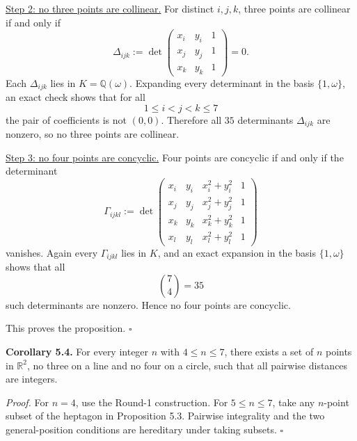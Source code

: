 \smallskip
\noindent\underline{Step 2: no three points are collinear.}
For distinct $i,j,k$, three points are collinear if and only if
\[
\Delta_{ijk}:=\det\begin{pmatrix}
x_i & y_i & 1\\
x_j & y_j & 1\\
x_k & y_k & 1
\end{pmatrix}=0.
\]
Each $\Delta_{ijk}$ lies in $K=\mathbb{Q}(\omega)$. Expanding every determinant in the basis $\{1,\omega\}$, an exact check shows that for all
\[
1\leq i<j<k\leq 7
\]
the pair of coefficients is not $(0,0)$. Therefore all $35$ determinants $\Delta_{ijk}$ are nonzero, so no three points are collinear.

\smallskip
\noindent\underline{Step 3: no four points are concyclic.}
Four points are concyclic if and only if the determinant
\[
\Gamma_{ijkl}:=\det\begin{pmatrix}
x_i & y_i & x_i^2+y_i^2 & 1\\
x_j & y_j & x_j^2+y_j^2 & 1\\
x_k & y_k & x_k^2+y_k^2 & 1\\
x_l & y_l & x_l^2+y_l^2 & 1
\end{pmatrix}
\]
vanishes. Again every $\Gamma_{ijkl}$ lies in $K$, and an exact expansion in the basis $\{1,\omega\}$ shows that all
\[
\binom{7}{4}=35
\]
such determinants are nonzero. Hence no four points are concyclic.

This proves the proposition.
\hfill$\square$

\medskip
\noindent\textbf{Corollary 5.4.}
For every integer $n$ with $4\leq n\leq 7$, there exists a set of $n$ points in $\mathbb{R}^2$, no three on a line and no four on a circle, such that all pairwise distances are integers.

\smallskip
\noindent\emph{Proof.}
For $n=4$, use the Round-1 construction. For $5\leq n\leq 7$, take any $n$-point subset of the heptagon in Proposition 5.3. Pairwise integrality and the two general-position conditions are hereditary under taking subsets.
\hfill$\square$


